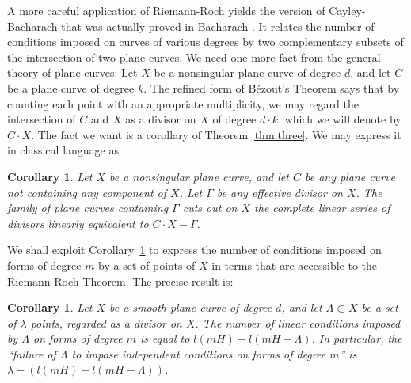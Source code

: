 \documentclass{bull-l}
\newtheorem{cor}[prop]{Corollary}
\theoremstyle{pplain}
\theoremstyle{definition}
\begin{document}
A more careful application of Riemann-Roch yields the version of
Cayley-\linebreak  
Bacharach that was actually proved in Bacharach \cite{Ba}.  It relates
the number of conditions imposed on curves of various degrees by two
complementary subsets of the intersection of two plane curves.  We need one
more fact from the general theory of plane curves: Let $X$ be a nonsingular
plane curve of degree $d$, and let $C$ be a plane curve of degree $k$.  The
refined form of B\'ezout's Theorem says that by counting each point with an
appropriate multiplicity, we may regard the intersection of $C$ and $X$ as a
divisor on $X$ of degree $d\cdot k$, which we will denote by $C\cdot X$.  The
fact we want is a corollary of Theorem \ref{thm:three}. We may express it in
classical language as 

\begin{cor}\label{cor:five}
Let $X$ be a nonsingular plane curve, and let $C$ be any plane curve not
containing any component of $X$.  Let $\Gamma$ be any effective divisor on $X$. 
The family of plane curves containing $\Gamma$ cuts out on $X$ the complete 
linear series of divisors linearly equivalent to 
$C\cdot X-\Gamma$. %
\end{cor}


We shall exploit Corollary~\ref{cor:five} to express the number of
conditions imposed on forms of degree $m$ by a set of points of $X$ in
terms that are accessible to the Riemann-Roch Theorem.  The precise result is:

\begin{cor} \label{cor:six}
Let $X$ be a smooth plane curve of degree $d$, and let $\Lambda\subset X$ be a
set of $\lambda$ points, regarded as a divisor on $X$.  The number of linear 
conditions imposed by $\Lambda$ on forms of degree $m$ is equal to $l(mH)-l(mH-
\Lambda)$.  In particular, the \textup{``}failure of $\Lambda$ to impose
independent conditions on forms of degree $m$\textup{''} is 
$\lambda-(l(mH)-l(mH-\Lambda))$.
\end{cor}
\end{document}
